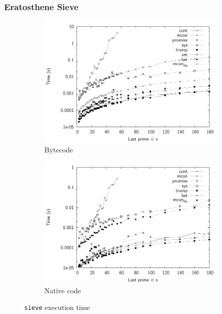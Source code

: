 \documentclass[12pt,twoside,notitlepage]{report}
\begin{document}
\subsubsection{Eratosthene Sieve}
\begin{figure}[h]
\centering
\begin{subfigure}[b]{0.45\linewidth}
\includegraphics[width=\linewidth]{./sieve_exec_times_bw}
\caption{Bytecode}
\label{fig:sieve_exec_times_bc}
\end{subfigure}
\begin{subfigure}[b]{0.45\linewidth}
\includegraphics[width=\linewidth]{./sieve_exec_times_opt_bw}
\caption{Native code}
\label{fig:sieve_exec_times_nat}
\end{subfigure}
\cprotect\caption{\verb|sieve| execution time}
\label{fig:sieve_exec_times}
\end{figure}
\end{document}
